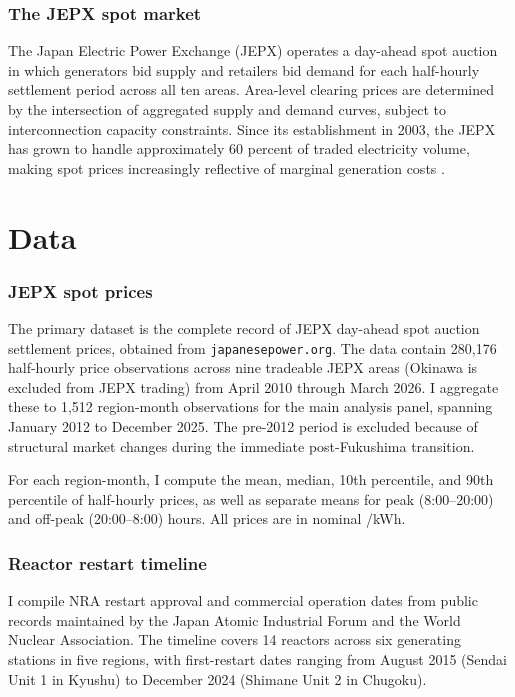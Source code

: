 \documentclass[12pt]{article}
\newcommand{\yen}{\textyen}
\begin{document}
\subsubsection*{The JEPX spot market} The Japan Electric Power Exchange (JEPX) operates a day-ahead spot auction in which generators bid supply and retailers bid demand for each half-hourly settlement period across all ten areas. Area-level clearing prices are determined by the intersection of aggregated supply and demand curves, subject to interconnection capacity constraints. Since its establishment in 2003, the JEPX has grown to handle approximately 60 percent of traded electricity volume, making spot prices increasingly reflective of marginal generation costs \citep{JEPX2024}.


\section{Data}
\label{sec:data}

\subsubsection*{JEPX spot prices} The primary dataset is the complete record of JEPX day-ahead spot auction settlement prices, obtained from \texttt{japanesepower.org}. The data contain 280,176 half-hourly price observations across nine tradeable JEPX areas (Okinawa is excluded from JEPX trading) from April 2010 through March 2026. I aggregate these to 1,512 region-month observations for the main analysis panel, spanning January 2012 to December 2025. The pre-2012 period is excluded because of structural market changes during the immediate post-Fukushima transition.

For each region-month, I compute the mean, median, 10th percentile, and 90th percentile of half-hourly prices, as well as separate means for peak (8:00--20:00) and off-peak (20:00--8:00) hours. All prices are in nominal \yen/kWh.

\subsubsection*{Reactor restart timeline} I compile NRA restart approval and commercial operation dates from public records maintained by the Japan Atomic Industrial Forum and the World Nuclear Association. The timeline covers 14 reactors across six generating stations in five regions, with first-restart dates ranging from August 2015 (Sendai Unit 1 in Kyushu) to December 2024 (Shimane Unit 2 in Chugoku).
\end{document}
